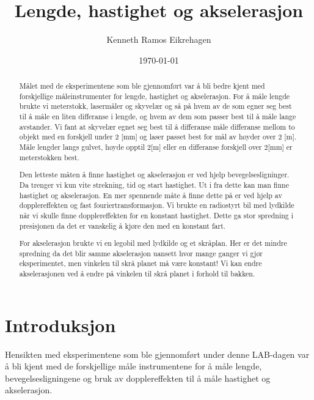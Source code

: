 \documentclass[norsk,a4paper,12pt]{article}
\title{Lengde, hastighet og akselerasjon}
\author{Kenneth Ramos Eikrehagen}
\date{\today}
\begin{document}
\renewcommand{\abstractname}{\large Sammendrag}
\renewcommand{\contentsname}{\LARGE Innhold}
\renewcommand{\listfigurename}{\Large Figur liste}
\renewcommand{\listtablename}{\Large Tabell liste}

\maketitle
\newpage
\tableofcontents
\listoffigures
\listoftables
\newpage


\begin{abstract}
Målet med de eksperimentene som ble gjennomført var å bli bedre kjent med forskjellige måleinstrumenter for lengde, hastighet og akselerasjon. For å måle lengde brukte vi meterstokk, lasermåler og skyvelær og så på hvem av de som egner seg best til å måle en liten differanse i lengde, og hvem av dem som passer best til å måle lange avstander. Vi fant at skyvelær egnet seg best til å differanse måle differanse mellom to objekt med en forskjell under 2 [mm] og laser passet best for mål av høyder over 2 [m]. Måle lengder langs gulvet, høyde opptil 2[m] eller en differanse forskjell over 2[mm] er meterstokken best.

Den letteste måten å finne hastighet og akselerasjon er ved hjelp bevegelsesligninger. Da trenger vi kun vite strekning, tid og start hastighet. Ut i fra dette kan man finne hastighet og akselerasjon. En mer spennende måte å finne dette på er ved hjelp av dopplereffekten og fast fouriertransformasjon. Vi brukte en radiostyrt bil med lydkilde når vi skulle finne dopplereffekten for en konstant hastighet. Dette ga stor spredning i presisjonen da det er vanskelig å kjøre den med en konstant fart. 

For akselerasjon brukte vi en legobil med lydkilde og et skråplan. Her er det mindre spredning da det blir samme akselerasjon uansett hvor mange ganger vi gjør eksperimentet, men vinkelen til skrå planet må være konstant! Vi kan endre akselerasjonen ved å endre på vinkelen til skrå planet i forhold til bakken. 
\end{abstract}

\section{Introduksjon}
Hensikten med eksperimentene som ble gjennomført under denne LAB-dagen var å bli kjent med de forskjellige måle instrumentene for å måle lengde, bevegelsesligningene og bruk av dopplereffekten til å måle hastighet og akselerasjon. 
\end{document}
